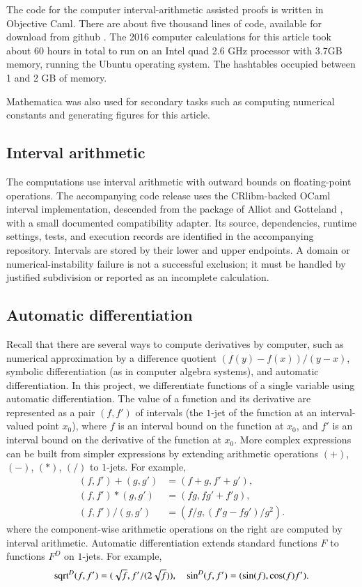 The code for the computer interval-arithmetic assisted proofs is written in Objective
Caml.  There are about five thousand lines of code, available for
download from github \cite{Git}.  The 2016 computer calculations for this
article took about 60 hours in total to run on an Intel quad 2.6 GHz
processor with 3.7GB memory, running the Ubuntu operating system. The
hashtables occupied between 1 and 2 GB of memory.

Mathematica was also used for secondary tasks such as computing numerical
constants and generating figures for this article.

\subsection{Interval arithmetic}

The computations use interval arithmetic with outward bounds on
floating-point operations. The accompanying code release uses the
CRlibm-backed OCaml interval implementation, descended from the
package of Alliot and Gotteland \cite{All}, with a small documented
compatibility adapter. Its source, dependencies, runtime settings,
tests, and execution records are identified in the accompanying
repository. Intervals are stored by their lower and upper endpoints.
A domain or numerical-instability failure is not a successful
exclusion; it must be handled by justified subdivision or reported
as an incomplete calculation.

\subsection{Automatic differentiation}

Recall that there are several ways to compute derivatives by computer,
such as numerical approximation by a difference quotient
$(f(y)-f(x))/(y-x)$, symbolic differentiation (as in computer algebra
systems), and automatic differentiation.  In this project, we
differentiate functions of a single variable using automatic
differentiation.  The value of a function and its derivative are
represented as a pair $(f,f')$ of intervals (the $1$-jet of the
function at an interval-valued point $x_0$), where $f$ is an interval
bound on the function at $x_0$, and $f'$ is an interval bound on the
derivative of the function at $x_0$.  More complex expressions can be
built from simpler expressions by extending arithmetic operations
$(+)$, $(-)$, $(*)$, $(/)$ to $1$-jets.  For example,
\begin{align*}
(f,f') + (g,g') &= (f+g,f'+g'),\\
(f,f') * (g,g') &= (f g,f g' + f' g),\\
(f,f') / (g,g') &= (f / g, (f' g - f g')/g^2).
\end{align*}
where the component-wise arithmetic operations on the right are
computed by interval arithmetic.  Automatic differentiation extends
standard functions $F$ to functions $F^D$ on $1$-jets.
For example,
\[
{\operatorname{sqrt}}^D(f,f') = (\sqrt{f}, f'/(2\sqrt{f})),\quad 
\sin^D (f,f') = (\sin(f), \cos(f) f').
\]

